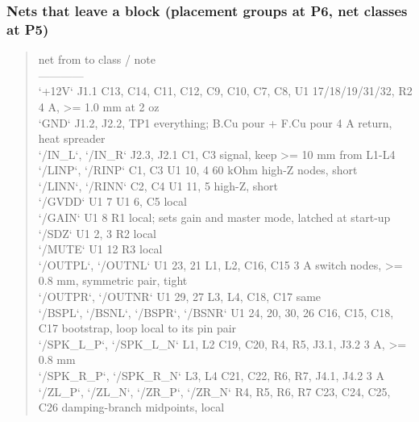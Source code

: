 \documentclass[11pt]{article}
\begin{document}
\subsubsection*{Nets that leave a block (placement groups at P6, net classes at P5)}
\begin{quote}\small\ttfamily\raggedright
\textbar{} net \textbar{} from \textbar{} to \textbar{} class / note \textbar{}\\
\textbar{}---\textbar{}---\textbar{}---\textbar{}---\textbar{}\\
\textbar{} `+12V` \textbar{} J1.1 \textbar{} C13, C14, C11, C12, C9, C10, C7, C8, U1 17/18/19/31/32, R2 \textbar{} 4 A, \textgreater{}= 1.0 mm at 2 oz \textbar{}\\
\textbar{} `GND` \textbar{} J1.2, J2.2, TP1 \textbar{} everything; B.Cu pour + F.Cu pour \textbar{} 4 A return, heat spreader \textbar{}\\
\textbar{} `/IN\_L`, `/IN\_R` \textbar{} J2.3, J2.1 \textbar{} C1, C3 \textbar{} signal, keep \textgreater{}= 10 mm from L1-L4 \textbar{}\\
\textbar{} `/LINP`, `/RINP` \textbar{} C1, C3 \textbar{} U1 10, 4 \textbar{} 60 kOhm high-Z nodes, short \textbar{}\\
\textbar{} `/LINN`, `/RINN` \textbar{} C2, C4 \textbar{} U1 11, 5 \textbar{} high-Z, short \textbar{}\\
\textbar{} `/GVDD` \textbar{} U1 7 \textbar{} U1 6, C5 \textbar{} local \textbar{}\\
\textbar{} `/GAIN` \textbar{} U1 8 \textbar{} R1 \textbar{} local; sets gain and master mode, latched at start-up \textbar{}\\
\textbar{} `/SDZ` \textbar{} U1 2, 3 \textbar{} R2 \textbar{} local \textbar{}\\
\textbar{} `/MUTE` \textbar{} U1 12 \textbar{} R3 \textbar{} local \textbar{}\\
\textbar{} `/OUTPL`, `/OUTNL` \textbar{} U1 23, 21 \textbar{} L1, L2, C16, C15 \textbar{} 3 A switch nodes, \textgreater{}= 0.8 mm, symmetric pair, tight \textbar{}\\
\textbar{} `/OUTPR`, `/OUTNR` \textbar{} U1 29, 27 \textbar{} L3, L4, C18, C17 \textbar{} same \textbar{}\\
\textbar{} `/BSPL`, `/BSNL`, `/BSPR`, `/BSNR` \textbar{} U1 24, 20, 30, 26 \textbar{} C16, C15, C18, C17 \textbar{} bootstrap, loop local to its pin pair \textbar{}\\
\textbar{} `/SPK\_L\_P`, `/SPK\_L\_N` \textbar{} L1, L2 \textbar{} C19, C20, R4, R5, J3.1, J3.2 \textbar{} 3 A, \textgreater{}= 0.8 mm \textbar{}\\
\textbar{} `/SPK\_R\_P`, `/SPK\_R\_N` \textbar{} L3, L4 \textbar{} C21, C22, R6, R7, J4.1, J4.2 \textbar{} 3 A \textbar{}\\
\textbar{} `/ZL\_P`, `/ZL\_N`, `/ZR\_P`, `/ZR\_N` \textbar{} R4, R5, R6, R7 \textbar{} C23, C24, C25, C26 \textbar{} damping-branch midpoints, local \textbar{}
\end{quote}
\end{document}

